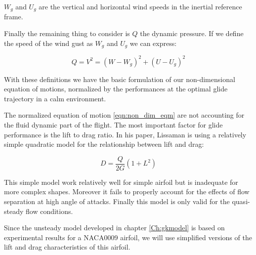 $W_g$ and $U_g$ are the vertical and horizontal wind speeds in the inertial reference frame.

\par Finally the remaining thing to consider is $Q$ the dynamic pressure. If we define the speed of the wind gust as $W_g$ and $U_g$ we can express:

\begin{equation}
  Q = V^2 = (W-W_g)^2 + (U-U_g)^2
  \label{eqn:q_def}
\end{equation}

\par With these definitions we have the basic formulation of our non-dimensional equation of motions, normalized by the performances at the optimal glide trajectory in a calm environment.

The normalized equation of motion \ref{eqn:non_dim_eqm} are not accounting for the fluid dynamic part of the flight.
The most important factor for glide performance is the lift to drag ratio. 
In his paper, Lissaman \cite{Lissaman2007neutral} is using a relatively simple quadratic model for the relationship between lift and drag:

\begin{equation}
  D=\frac{Q}{2G}(1+L^2)
  \label{eqn:Lissaman_G}
\end{equation}


\par This simple model work relatively well for simple airfoil but is inadequate for more complex shapes.
Moreover it fails to properly account for the effects of flow separation at high angle of attacks.
Finally this model is only valid for the quasi-steady flow conditions.

\par Since the unsteady model developed in chapter \ref{Ch:gkmodel} is based on experimental results for a NACA0009 airfoil, we will use simplified versions of the lift and drag characteristics of this airfoil.

